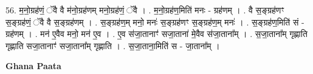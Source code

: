 \documentclass[17pt]{extarticle}
\begin{document}
56. म॒नो॒ग्रह॑णं॒ ॅवै वै म॑नो॒ग्रह॑णम् मनो॒ग्रह॑णं॒ ॅवै । . म॒नो॒ग्रह॑ण॒मिति॑ मनः - ग्रह॑णम् । . वै स॒ङ्ग्रह॑णꣳ स॒ङ्ग्रह॑णं॒ ॅवै वै स॒ङ्ग्रह॑णम् । . स॒ङ्ग्रह॑ण॒म् मनो॒ मनः॑ स॒ङ्ग्रह॑णꣳ स॒ङ्ग्रह॑ण॒म् मनः॑ । . स॒ङ्ग्रह॑ण॒मिति॑ सं - ग्रह॑णम् । . मन॑ ए॒वैव मनो॒ मन॑ ए॒व । . ए॒व स॑जा॒तानाꣳ॑ सजा॒ताना॑ मे॒वैव स॑जा॒ताना᳚म् । . स॒जा॒ताना᳚म् गृह्णाति गृह्णाति सजा॒तानाꣳ॑ सजा॒ताना᳚म् गृह्णाति । . स॒जा॒ताना॒मिति॑ स - जा॒ताना᳚म् । \newline

\textbf{Ghana Paata } \newline
\end{document}
